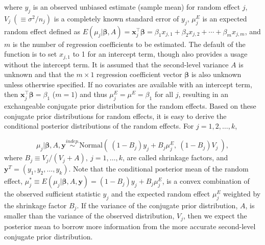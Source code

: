 \documentclass[article]{jss}
\begin{document}
where $y_j$ is an observed unbiased estimate (sample mean) for random effect $j$, $V_{j}~(\equiv \sigma^{2}/n_{j})$ is a completely known standard error of $y_j$, $\mu^E_{j}$ is an expected random effect defined as $E(\mu_j\vert \boldsymbol{\beta}, A) = \boldsymbol{x}_j^\top \boldsymbol{\beta}=\beta_{1}x_{j, 1}+\beta_{2}x_{j, 2} + \cdots + \beta_{m}x_{j, m}$, and $m$ is the number of regression coefficients to be estimated. The default of the function  is to set $x_{j, 1}$ to 1 for an intercept term, though  also provides a usage without the intercept term.  It is assumed that the second-level variance $A$ is unknown and that the $m\times1$ regression coefficient vector $\boldsymbol{\beta}$ is also unknown unless otherwise specified. If no covariates are available with an intercept term, then $\boldsymbol{x}_j^\top \boldsymbol{\beta}=\beta_1$ ($m=1$) and thus $\mu^E_{j}=\mu^E=\beta_1$ for all $j$, resulting in an exchangeable conjugate prior distribution for the random effects.  Based on these conjugate prior distributions for random effects, it is easy to derive the conditional posterior distributions of the random effects. For $j=1, 2, \ldots, k$,

\begin{equation} \label{normalpost}
\mu_{j}\vert  \boldsymbol{\beta}, A, \boldsymbol{y} \stackrel{indep.}{\sim}\textrm{Normal}(~(1-B_{j})y_{j} + B_{j}\mu^E_{j},~(1-B_{j})V_{j}~),
\end{equation}
where $B_{j}\equiv V_{j}/(V_{j} + A),~j=1, \ldots, k$, are called shrinkage factors, and $\boldsymbol{y}^T=(y_1, y_2, \ldots, y_k)$. Note that the conditional posterior mean of the random effect, $\mu^\ast_j\equiv E(\mu_{j}\vert \boldsymbol{\beta}, A, \boldsymbol{y} )=(1-B_{j})y_{j} + B_{j}\mu^E_{j}$,  is a convex combination of the observed sufficient statistic $y_j$ and the expected random effect $\mu^E_j$ weighted by the shrinkage factor $B_j$. If the variance of the conjugate prior distribution, $A$, is smaller than the variance of the observed distribution, $V_j$, then we expect the posterior mean to borrow more information from the more accurate second-level conjugate prior distribution.
\end{document}
